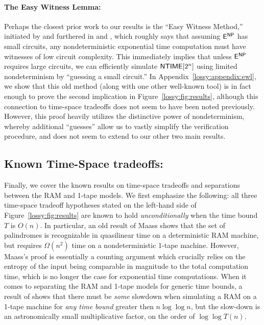 \paragraph{The Easy Witness Lemma:} Perhaps the closest prior work to our results is the ``Easy Witness Method,'' initiated by \cite{Kabenets} and furthered in \cite{IKW} and \cite{williams-sat}, which roughly says that assuming $\cl{E}^\cl{NP}$ has small circuits, any nondeterministic exponential time computation must have witnesses of low circuit complexity. This immediately implies that unless $\cl{E}^\cl{NP}$ requires large circuits, we can efficiently simulate $\cl{NTIME}[2^n]$ using limited nondeterminism by ``guessing a small circuit.'' In Appendix~\ref{lossy:appendix:ewl}, we show that this old method (along with one other well-known tool) is in fact enough to prove the second implication in Figure~\ref{lossy:fig:results}, although this connection to time-space tradeoffs does not seem to have been noted previously. However, this proof heavily utilizes the distinctive power of nondeterminism, whereby additional ``guesses'' allow us to vastly simplify the verification procedure, and does not seem to extend to our other two main results.

\subsection{Known Time-Space tradeoffs:}
Finally, we cover the known results on time-space tradeoffs and separations between the RAM and 1-tape models. We first emphasize the following: all three time-space tradeoff hypotheses stated on the left-hand side of Figure~\ref{lossy:fig:results} are known to hold \emph{unconditionally} when the time bound $T$ is $O(n)$. In particular, an old result of Maass \cite{palindromes} shows that the set of palindromes is recognizable in quasilinear time on a deterministic RAM machine, but requires $\Omega(n^2)$ time on a nondeterministic 1-tape machine. However, Maass's proof is essentially a counting argument which crucially relies on the entropy of the input being comparable in magnitude to the total computation time, which is no longer the case for exponential time computations. When it comes to separating the RAM and 1-tape models for generic time bounds, a result of \cite{robson} shows that there must be \emph{some} slowdown when simulating a RAM on a 1-tape machine for \emph{any time bound} greater then $n \log \log n$, but the slow-down is an astronomically small multiplicative factor, on the order of $\log \log T(n)$. 


